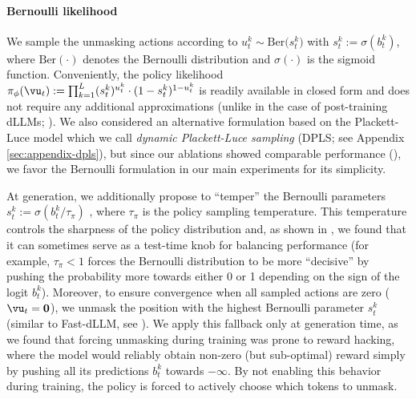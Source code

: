 \paragraph{Bernoulli likelihood} We sample the unmasking actions according to $u_t^k \sim \text{Ber}\big(s_t^k\big)$ with $s_t^k := \sigma(b_t^k)$, where $\text{Ber}(\cdot)$ denotes the Bernoulli distribution and $\sigma(\cdot)$ is the sigmoid function. Conveniently, the policy likelihood $\pi_{\phi}(\vu_t) := \prod_{k=1}^L (s_t^k)^{u_t^k} \cdot (1 - s_t^k)^{1-u_t^k}$ is readily available in closed form and does not require any additional approximations (unlike in the case of post-training dLLMs; \citealt{zhao2025d1}). We also considered an alternative formulation based on the Plackett-Luce model \citep{luce1959individual,plackett1975analysis} which we call \emph{dynamic Plackett-Luce sampling} (DPLS; see Appendix \ref{sec:appendix-dpls}), but since our ablations showed comparable performance (), we favor the Bernoulli formulation in our main experiments for its simplicity.

At generation, we additionally propose to ``temper'' the Bernoulli parameters $s_t^k := \sigma(b_t^k / \tau_{\pi})$ , where $\tau_{\pi}$ is the policy sampling temperature. This temperature controls the sharpness of the policy distribution and, as shown in , we found that it can sometimes serve as a test-time knob for balancing performance (for example,  $\tau_{\pi} < 1$ forces the Bernoulli distribution to be more ``decisive'' by pushing the probability more towards either 0 or 1 depending on the sign of the logit $b_t^k$). Moreover, to ensure convergence when all sampled actions are zero ($\vu_t = \mathbf{0}$), we unmask the position with the highest Bernoulli parameter $s_t^k$ (similar to Fast-dLLM, see ). 
We apply this fallback only at generation time, as we found that forcing unmasking during training was prone to reward hacking, where the model would reliably obtain non-zero (but sub-optimal) reward simply by pushing all its predictions $b_t^k$ towards $-\infty$.
By not enabling this behavior during training, the policy is forced to actively choose which tokens to unmask.







